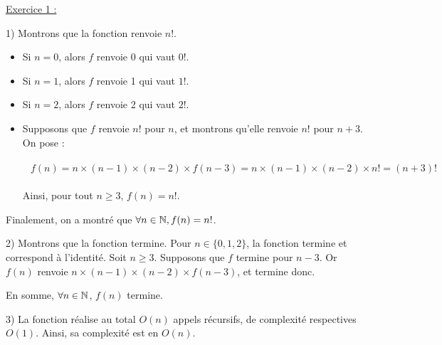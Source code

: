 \documentclass{article}
\begin{document}
\underline{Exercice 1 :}

\bigskip
\bigskip
\bigskip

1) Montrons que la fonction renvoie $n!$.

\begin{itemize}
    \item Si $n=0$, alors $f$ renvoie 0 qui vaut $0!$.
    \item Si $n=1$, alors $f$ renvoie 1 qui vaut $1!$.
    \item Si $n=2$, alors $f$ renvoie 2 qui vaut $2!$.
    \item Supposons que $f$ renvoie $n!$ pour $n$, et montrons qu'elle renvoie $n!$ pour $n+3$. On pose :

    \begin{align*}\begin{split}
        f(n) = n\times(n-1)\times(n-2)\times f(n-3) = n\times(n-1)\times(n-2)\times n! = (n+3)!
    \end{split}\end{align*}

    Ainsi, pour tout $n\geq 3$, $f(n)=n!$.
\end{itemize}

Finalement, on a montré que $\forall n\in\mathbb{N}, f(n)=n!$.

\bigskip
\bigskip

2) Montrons que la fonction termine. Pour $n\in\{0, 1, 2\}$, la fonction termine et correspond à l'identité. Soit $n\geq 3$. Supposons que $f$ termine pour $n-3$. Or $f(n)$ renvoie $n\times(n-1)\times(n-2)\times f(n-3)$, et termine donc.

En somme, $\forall n\in\mathbb{N}$, $f(n)$ termine.

\bigskip
\bigskip

3) La fonction réalise au total $O(n)$ appels récursifs, de complexité respectives $O(1)$. Ainsi, sa complexité est en $O(n)$.
\end{document}
